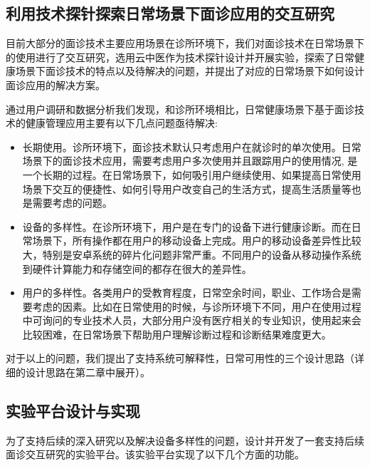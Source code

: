 \subsection{利用技术探针探索日常场景下面诊应用的交互研究}

目前大部分的面诊技术主要应用场景在诊所环境下，我们对面诊技术在日常场景下的使用进行了交互研究，选用云中医作为技术探针设计并开展实验，探索了日常健康场景下面诊技术的特点以及待解决的问题，并提出了对应的日常场景下如何设计面诊应用的解决方案。

通过用户调研和数据分析我们发现，和诊所环境相比，日常健康场景下基于面诊技术的健康管理应用主要有以下几点问题亟待解决: 

\begin{itemize}
    
    \item 长期使用。诊所环境下，面诊技术默认只考虑用户在就诊时的单次使用。日常场景下的面诊技术应用，需要考虑用户多次使用并且跟踪用户的使用情况, 是一个长期的过程。在日常场景下，如何吸引用户继续使用、如果提高日常使用场景下交互的便捷性、如何引导用户改变自己的生活方式，提高生活质量等也是需要考虑的问题。

    \item 设备的多样性。在诊所环境下，用户是在专门的设备下进行健康诊断。而在日常场景下，所有操作都在用户的移动设备上完成。用户的移动设备差异性比较大，特别是安卓系统的碎片化问题非常严重。不同用户的设备从移动操作系统到硬件计算能力和存储空间的都存在很大的差异性。
    
    \item 用户的多样性。各类用户的受教育程度，日常空余时间，职业、工作场合是需要考虑的因素。比如在日常使用的时候，与诊所环境下不同，用户在使用过程中可询问的专业技术人员，大部分用户没有医疗相关的专业知识，使用起来会比较困难，在日常场景下帮助用户理解诊断过程和诊断结果难度更大。

\end{itemize}

对于以上的问题，我们提出了支持系统可解释性，日常可用性的三个设计思路（详细的设计思路在第二章中展开）。

\subsection{实验平台设计与实现}

为了支持后续的深入研究以及解决设备多样性的问题，设计并开发了一套支持后续面诊交互研究的实验平台。该实验平台实现了以下几个方面的功能。

